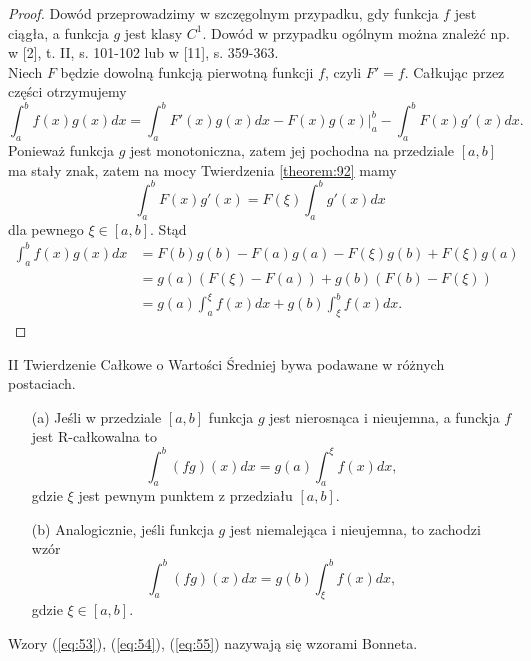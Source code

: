 \documentclass[leqno]{article}
\begin{document}
\begin{justify}
\begin{proof}
    Dowód przeprowadzimy w szczęgolnym przypadku, gdy funkcja $f$ jest ciągła, a funkcja $g$ jest klasy $C^1$. Dowód w przypadku ogólnym można znależć np. w [2], t. II, s. 101-102 lub w [11], s. 359-363. \\
    Niech $F$ będzie dowolną funkcją pierwotną funkcji $f$, czyli $F'=f$. Całkując przez części otrzymujemy
    \[
        \int_{a}^{b}f(x)g(x)dx = \int_{a}^{b}F'(x)g(x)dx - F(x)g(x) \big|_a^b - \int_{a}^{b}F(x)g'(x)dx.
    \]
    Ponieważ funkcja $g$ jest monotoniczna, zatem jej pochodna na przedziale $[a,b]$ ma stały znak, zatem na mocy
    Twierdzenia \ref{theorem:92} mamy
    \[
        \int_{a}^{b}F(x)g'(x) = F(\xi)\int_{a}^{b}g'(x)dx
    \]
    dla pewnego $\xi \in [a,b]$. Stąd
    \begin{align*}
        \int_{a}^{b}f(x)g(x)dx &= F(b)g(b) - F(a)g(a) - F(\xi)g(b) + F(\xi)g(a) \\
                               &= g(a)(F(\xi) - F(a)) + g(b)(F(b) - F(\xi)) \\
                               &= g(a)\int_{a}^{\xi}f(x)dx + g(b)\int_{\xi}^{b}f(x)dx.
    \end{align*}
\end{proof}

\begin{uwaga}
    II Twierdzenie Całkowe o Wartości Średniej bywa podawane w różnych postaciach.
    \begin{enumerate}
        \item[(a)] 
            Jeśli w przedziale $[a,b]$ funkcja $g$ jest nierosnąca i nieujemna, a funckja $f$ jest R-całkowalna to
            \begin{equation}\label{eq:54}
                \int_{a}^{b}(fg)(x)dx = g(a)\int_{a}^{\xi}f(x)dx,
            \end{equation}
            gdzie $\xi$ jest pewnym punktem z przedziału $[a,b]$. 
        \item[(b)] 
            Analogicznie, jeśli funkcja $g$ jest niemalejąca i nieujemna, to zachodzi wzór
            \begin{equation}\label{eq:55}
                \int_{a}^{b}(fg)(x)dx = g(b)\int_{\xi}^{b}f(x)dx,
            \end{equation}
            gdzie $\xi \in [a,b]$.
    \end{enumerate}
    Wzory (\ref{eq:53}), (\ref{eq:54}), (\ref{eq:55}) nazywają się wzorami Bonneta.
\end{uwaga}


\end{justify}
\end{document}
